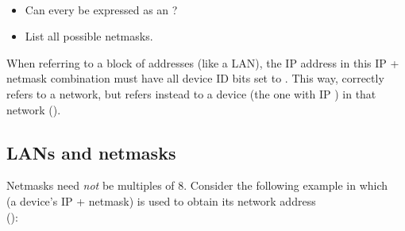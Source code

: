 \begin{exercise}\ \\[-0.65cm]
\begin{itemize}
\item Can every  be expressed as an ?
\item List all possible netmasks.\\[-0.5cm]
\end{itemize}
\end{exercise}

When referring to a block of addresses (like a LAN), 
the IP address in this IP + netmask combination
must have all device ID bits set to . 
This way,  correctly refers to a network, but
 refers instead to a device 
(the one with IP ) in that network ().

\subsection{LANs and netmasks}

Netmasks need \textit{not} be multiples of $8$. Consider the following example in which \\
 (a device's IP + netmask) is used to obtain its network address\\
():\\

